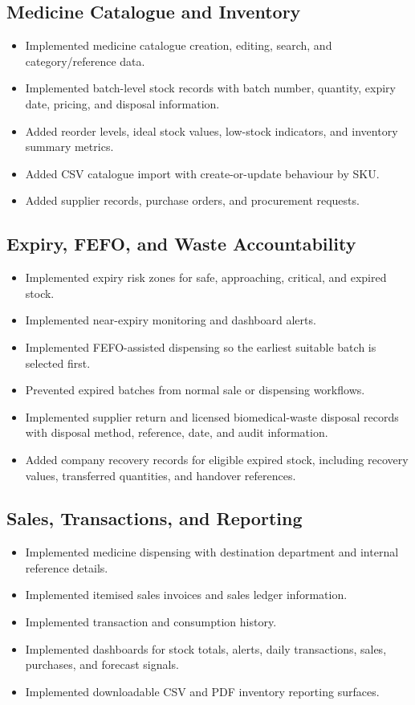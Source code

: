 \documentclass[12pt,a4paper]{article}
\begin{document}
\subsection{Medicine Catalogue and Inventory}
\begin{itemize}[leftmargin=*]
    \item Implemented medicine catalogue creation, editing, search, and
    category/reference data.
    \item Implemented batch-level stock records with batch number, quantity,
    expiry date, pricing, and disposal information.
    \item Added reorder levels, ideal stock values, low-stock indicators, and
    inventory summary metrics.
    \item Added CSV catalogue import with create-or-update behaviour by SKU.
    \item Added supplier records, purchase orders, and procurement requests.
\end{itemize}

\subsection{Expiry, FEFO, and Waste Accountability}
\begin{itemize}
    \item Implemented expiry risk zones for safe, approaching, critical, and
    expired stock.
    \item Implemented near-expiry monitoring and dashboard alerts.
    \item Implemented FEFO-assisted dispensing so the earliest suitable batch is
    selected first.
    \item Prevented expired batches from normal sale or dispensing workflows.
    \item Implemented supplier return and licensed biomedical-waste disposal
    records with disposal method, reference, date, and audit information.
    \item Added company recovery records for eligible expired stock, including
    recovery values, transferred quantities, and handover references.
\end{itemize}

\subsection{Sales, Transactions, and Reporting}
\begin{itemize}
    \item Implemented medicine dispensing with destination department and
    internal reference details.
    \item Implemented itemised sales invoices and sales ledger information.
    \item Implemented transaction and consumption history.
    \item Implemented dashboards for stock totals, alerts, daily transactions,
    sales, purchases, and forecast signals.
    \item Implemented downloadable CSV and PDF inventory reporting surfaces.
\end{itemize}
\end{document}
